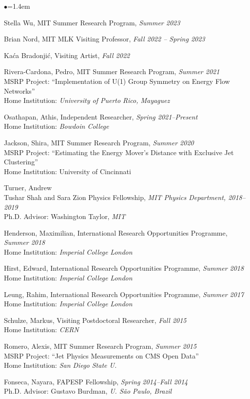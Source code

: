 \documentclass[11pt]{article}
\newcommand{\sh}{\phantom{.....}}
\newcommand{\bbl}{\begin{list}{$\bullet$}{\leftmargin=1.4em \itemsep=-1pt}}
\newcommand{\el}{\end{list}}
\begin{document}
\bbl 
\item Stella Wu, MIT Summer Research Program, \textit{Summer 2023}
\item Brian Nord, MIT MLK Visiting Professor, \textit{Fall 2022 -- Spring 2023}
\item Kaća Bradonjić, Visiting Artist, \textit{Fall 2022}
\item Rivera-Cardona, Pedro, MIT Summer Research Program, \textit{Summer 2021}
\\ \sh MSRP Project: ``Implementation of U(1) Group Symmetry on Energy Flow Networks''
\\ \sh Home Institution:  \textit{University of Puerto Rico, Mayaguez}
\item  Osathapan, Athis, Independent Researcher, \textit{Spring 2021--Present}
\\ \sh Home Institution: \textit{Bowdoin College}
\item Jackson, Shira, MIT Summer Research Program, \textit{Summer 2020}
\\ \sh MSRP Project: “Estimating the Energy Mover’s Distance with Exclusive Jet Clustering”
\\ \sh Home Institution: University of Cincinnati
\item  Turner, Andrew
\\ \sh Tushar Shah and Sara Zion Physics Fellowship, \textit{MIT Physics Department, 2018--2019}
\\ \sh    Ph.D. Advisor: Washington Taylor, \textit{MIT}
\item   Henderson, Maximilian, International Research Opportunities Programme, \textit{Summer 2018}
\\ \sh Home Institution: \textit{Imperial College London}
\item  Hirst, Edward, International Research Opportunities Programme, \textit{Summer 2018}
\\ \sh Home Institution: \textit{Imperial College London}
\item Leung, Rahim, International Research Opportunities Programme, \textit{Summer 2017}
\\ \sh Home Institution: \textit{Imperial College London}
\item Schulze, Markus, Visiting Postdoctoral Researcher, \textit{Fall 2015}
\\ \sh Home Institution:  \textit{CERN}
\item Romero, Alexis, MIT Summer Research Program, \textit{Summer 2015}
\\ \sh MSRP Project: ``Jet Physics Measurements on CMS Open Data''
\\ \sh Home Institution:  \textit{San Diego State U.}
\item Fonseca, Nayara, FAPESP Fellowship, \textit{Spring 2014--Fall 2014}
\\ \sh Ph.D. Advisor:  Gustavo Burdman, \textit{U. S\~ao Paulo, Brazil}
\el
\end{document}
